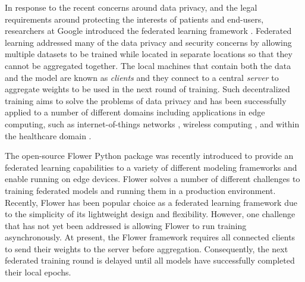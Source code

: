 \documentclass[twocolumn, switch]{article} %
\begin{document}
In response to the recent concerns around data privacy, and the legal requirements around protecting the interests of patients and end-users, researchers at Google introduced the federated learning framework \cite{fed_1, fed_2}. Federated learning addressed many of the data privacy and security concerns by allowing multiple datasets to be trained while located in separate locations so that they cannot be aggregated together. The local machines that contain both the data and the model are known as \textit{clients} and they connect to a central \textit{server} to aggregate weights to be used in the next round of training. Such decentralized training aims to solve the problems of data privacy and has been successfully applied to a number of different domains including applications in edge computing, such as internet-of-things networks \cite{fed_iot}, wireless computing \cite{fed_wireless}, and within the healthcare domain \cite{fed_healthcare}. 

The open-source Flower Python package \cite{flower} was recently introduced to provide an federated learning capabilities to a variety of different modeling frameworks and enable running on edge devices. Flower solves a number of different challenges to training federated models and running them in a production environment. Recently, Flower has been popular choice as a federated learning framework due to the simplicity of its lightweight design and flexibility. However, one challenge that has not yet been addressed is allowing Flower to run training asynchronously. At present, the Flower framework requires all connected clients to send their weights to the server before aggregation. Consequently, the next federated training round is delayed until all models have successfully completed their local epochs.
\end{document}
